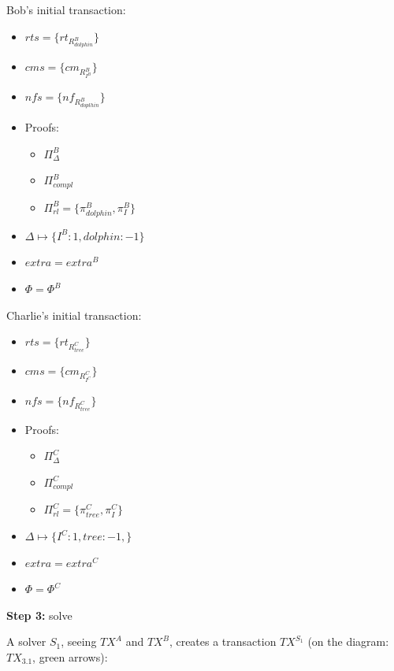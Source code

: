 Bob's initial transaction:
\begin{itemize}
    \item $rts = \{rt_{R^B_{dolphin}}\}$
    \item $cms = \{cm_{R^B_{I^{B}}}\}$
    \item $nfs = \{nf_{R^B_{doplhin}}\}$
    \item Proofs:
    \begin{itemize}
        \item $\Pi^B_{\Delta}$
        \item $\Pi^B_{compl}$
        \item $\Pi^B_{rl} = \{\pi^B_{dolphin}, \pi^B_I\}$
    \end{itemize}
    \item $\Delta \mapsto \{I^{B}: 1, dolphin: -1 \}$
    \item $extra = extra^B$
    \item $\Phi = \Phi^B$
\end{itemize}

Charlie's initial transaction:
\begin{itemize}
    \item $rts = \{rt_{R^C_{tree}}\}$
    \item $cms = \{cm_{R^C_{I^{C}}}\}$
    \item $nfs = \{nf_{R^C_{tree}}\}$
    \item Proofs:
    \begin{itemize}
        \item $\Pi^C_{\Delta}$
        \item $\Pi^C_{compl}$
        \item $\Pi^C_{rl} = \{\pi^C_{tree}, \pi^C_I\}$
    \end{itemize}
    \item $\Delta \mapsto \{I^{C}: 1, tree: -1, \}$
    \item $extra = extra^C$
    \item $\Phi = \Phi^C$
\end{itemize}

\textbf{Step 3:} solve

A solver $S_1$, seeing $TX^A$ and $TX^B$, creates a transaction $TX^{S_1}$ (on the diagram: $TX_{3.1}$, green arrows):

